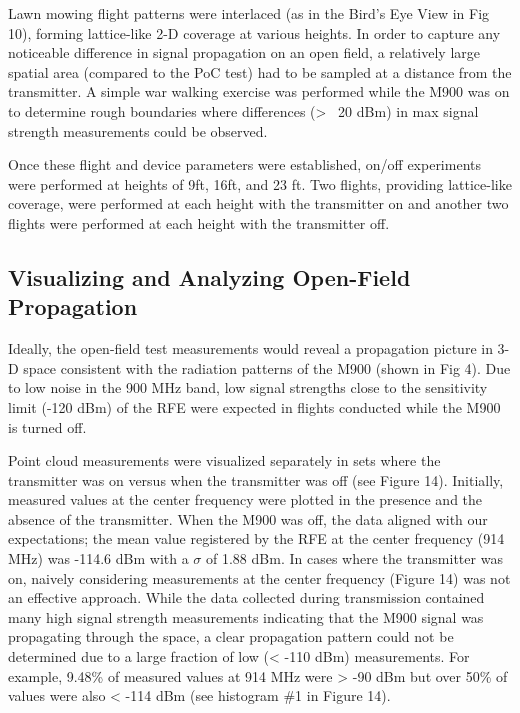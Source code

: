 \documentclass[pageno]{jpaper}
\begin{document}
Lawn mowing flight patterns were interlaced (as in the Bird's Eye View in Fig 10), forming lattice-like 2-D coverage at various heights. In order to capture any noticeable difference in signal propagation on an open field, a relatively large spatial area (compared to the PoC test) had to be sampled at a distance from the transmitter. A simple war walking exercise was performed while the M900 was on to determine rough boundaries where differences (> ~20 dBm) in max signal strength measurements could be observed. 

Once these flight and device parameters were established, on/off experiments were performed at heights of 9ft, 16ft, and 23 ft. Two flights, providing lattice-like coverage, were performed at each height with the transmitter on and another two flights were performed at each height with the transmitter off. 

\subsection{Visualizing and Analyzing Open-Field Propagation}
Ideally, the open-field test measurements would reveal a propagation picture in 3-D space consistent with the radiation patterns of the M900 (shown in Fig 4). Due to low noise in the 900 MHz band, low signal strengths close to the sensitivity limit (-120 dBm)  of the RFE were expected in flights conducted while the M900 is turned off. 

Point cloud measurements were visualized separately in sets where the transmitter was on versus when the transmitter was off (see Figure 14). Initially, measured values at the center frequency were plotted in the presence and the absence of the transmitter. When the M900 was off, the data aligned with our expectations; the mean value registered by the RFE at the center frequency (914 MHz) was -114.6 dBm with a $\sigma$ of 1.88 dBm. In cases where the transmitter was on, naively considering measurements at the center frequency (Figure 14) was not an effective approach. While the data collected during transmission contained many high signal strength measurements indicating that the M900 signal was propagating through the space, a clear propagation pattern could not be determined due to a large fraction of low (< -110 dBm) measurements. For example, 9.48\% of measured values at 914 MHz were > -90 dBm but over 50\% of values were also < -114 dBm (see histogram \#1 in Figure 14).
\end{document}
